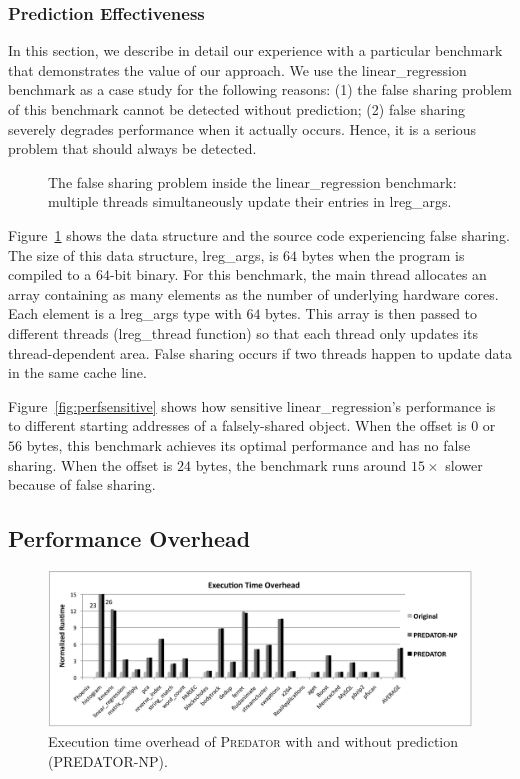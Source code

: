 \documentclass[10pt]{sigplanconf}
\newcommand{\Predator}{{\scshape Predator}}
\begin{document}
\subsubsection{Prediction Effectiveness}
\label{sec:predicteval}
In this section, we describe in detail our experience with a particular benchmark that demonstrates the value of our approach. We use the linear\_regression benchmark as a case study for the following reasons: (1) the false sharing problem of this benchmark cannot be detected without prediction; (2) false sharing severely degrades performance when it actually occurs. Hence, it is a serious problem that should always be detected. 

\begin{figure}[!t]
{\centering
\subfigure{}
\caption{The false sharing problem inside the linear\_regression benchmark: multiple threads simultaneously update their entries in lreg\_args.
\label{fig:linearregression}}
}
\end{figure}

Figure~\ref{fig:linearregression} shows the data structure and the source code experiencing false sharing. The size of this data structure, lreg\_args, is $64$ bytes 
when the program is compiled to a $64$-bit binary. For this benchmark, the main thread allocates an array containing as many elements as the number of underlying hardware cores. Each element is a lreg\_args type with $64$ bytes. This array is then passed to different threads (lreg\_thread function) so that each thread only updates its thread-dependent area. False sharing occurs if two threads happen to update data in the same cache line. 

Figure~\ref{fig:perfsensitive} shows how sensitive linear\_regression's performance is to different starting addresses of a falsely-shared object. When the offset is $0$ or $56$ bytes, this benchmark achieves its optimal performance and has no false sharing. When the offset is $24$ bytes, the benchmark runs around $15\times$ slower because of false sharing.

\subsection{Performance Overhead}
\label{sec:perfoverhead}

\begin{figure}[!t]
\centering
\includegraphics[width=6in]{fig/perf}
\caption{
Execution time overhead of \Predator{} with and without prediction (PREDATOR-NP).
\label{fig:perf}}
\end{figure}
\end{document}
